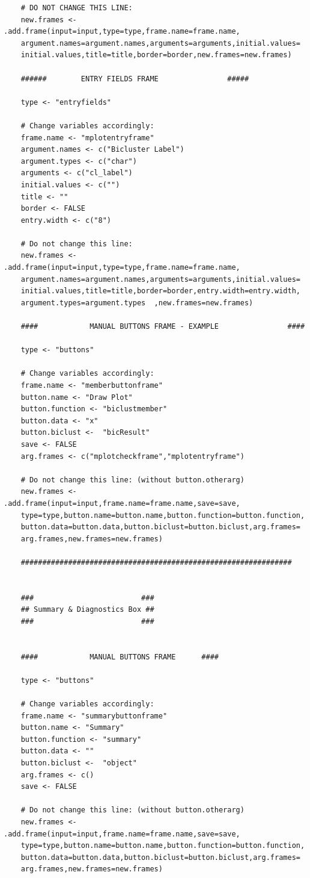 \documentclass[a4paper]{article}\usepackage[]{graphicx}\usepackage[]{color}
\begin{document}
\begin{verbatim}
	# DO NOT CHANGE THIS LINE:
	new.frames <- .add.frame(input=input,type=type,frame.name=frame.name,
    argument.names=argument.names,arguments=arguments,initial.values=
    initial.values,title=title,border=border,new.frames=new.frames)
	
	######		  ENTRY FIELDS FRAME 				#####
	
	type <- "entryfields"
	
	# Change variables accordingly:
	frame.name <- "mplotentryframe"  
	argument.names <- c("Bicluster Label") 
	argument.types <- c("char")
	arguments <- c("cl_label")
	initial.values <- c("")
	title <- ""
	border <- FALSE
	entry.width <- c("8")  
	
	# Do not change this line:
	new.frames <- .add.frame(input=input,type=type,frame.name=frame.name,
    argument.names=argument.names,arguments=arguments,initial.values=
    initial.values,title=title,border=border,entry.width=entry.width,
    argument.types=argument.types  ,new.frames=new.frames)
	
	####	    	MANUAL BUTTONS FRAME - EXAMPLE 				  ####
	
	type <- "buttons"
	
	# Change variables accordingly:
	frame.name <- "memberbuttonframe"  
	button.name <- "Draw Plot"  
	button.function <- "biclustmember" 
	button.data <- "x" 
	button.biclust <-  "bicResult" 
	save <- FALSE
	arg.frames <- c("mplotcheckframe","mplotentryframe") 
	
	# Do not change this line: (without button.otherarg)
	new.frames <- .add.frame(input=input,frame.name=frame.name,save=save,
    type=type,button.name=button.name,button.function=button.function,
    button.data=button.data,button.biclust=button.biclust,arg.frames=
    arg.frames,new.frames=new.frames)
	
	###############################################################
	
	
	###                         ###
	## Summary & Diagnostics Box ##
	###                         ###
	
	
	####	    	MANUAL BUTTONS FRAME 	  ####
	
	type <- "buttons"
	
	# Change variables accordingly:
	frame.name <- "summarybuttonframe"  
	button.name <- "Summary"  
	button.function <- "summary" 
	button.data <- "" 
	button.biclust <-  "object" 
	arg.frames <- c()
	save <- FALSE
	
	# Do not change this line: (without button.otherarg)
	new.frames <- .add.frame(input=input,frame.name=frame.name,save=save,
    type=type,button.name=button.name,button.function=button.function,
    button.data=button.data,button.biclust=button.biclust,arg.frames=
    arg.frames,new.frames=new.frames)
	

\end{verbatim}
\end{document}
